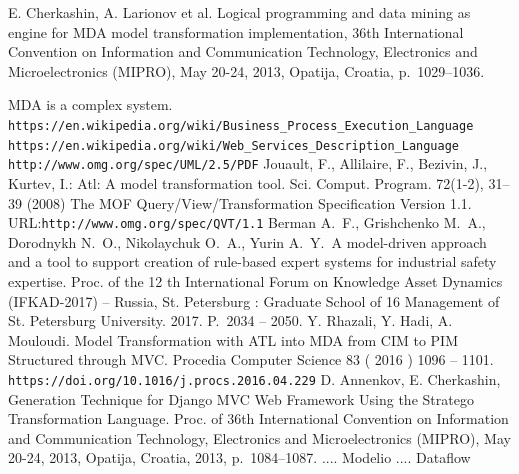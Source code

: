 \documentclass[conference,a4paper]{IEEEtran}
\providecommand\url[1]{\texttt{#1}}
\begin{document}
\begin{thebibliography}{11}
 E. Cherkashin, A. Larionov et al. Logical programming and data mining as engine for MDA model transformation implementation, 36th International Convention on Information and Communication Technology, Electronics and Microelectronics (MIPRO), May 20-24, 2013, Opatija, Croatia, p.~1029--1036.


MDA is a complex system.
 \url{https://en.wikipedia.org/wiki/Business_Process_Execution_Language}
 \url{https://en.wikipedia.org/wiki/Web_Services_Description_Language}
 \url{http://www.omg.org/spec/UML/2.5/PDF}
 Jouault, F., Allilaire, F., Bezivin, J., Kurtev, I.: Atl: A model transformation tool. Sci. Comput. Program. 72(1-2), 31–39 (2008)
 The MOF Query/View/Transformation Specification Version 1.1. URL:\url{http://www.omg.org/spec/QVT/1.1}
 Berman A.~F., Grishchenko M.~A., Dorodnykh N.~O., Nikolaychuk O.~A., Yurin A.~Y.~A model-driven approach and a tool to support creation of rule-based expert systems for industrial safety expertise. Proc. of the 12 th International Forum on Knowledge Asset Dynamics (IFKAD-2017) – Russia, St. Petersburg : Graduate School of 16 Management of St. Petersburg University.  2017.  P.~2034 – 2050.
\bibitem{}Y. Rhazali, Y. Hadi, A. Mouloudi. Model Transformation with ATL into MDA from CIM to PIM Structured through MVC. Procedia Computer Science 83 ( 2016 ) 1096 – 1101. \url{https://doi.org/10.1016/j.procs.2016.04.229}
 D. Annenkov, E. Cherkashin, Generation Technique for Django MVC Web Framework Using the Stratego Transformation Language. Proc. of 36th International Convention on Information and Communication Technology, Electronics and Microelectronics (MIPRO), May 20-24, 2013, Opatija, Croatia, 2013, p.~1084--1087.
 .... Modelio
 .... Dataflow
\end{thebibliography}




\end{document}
